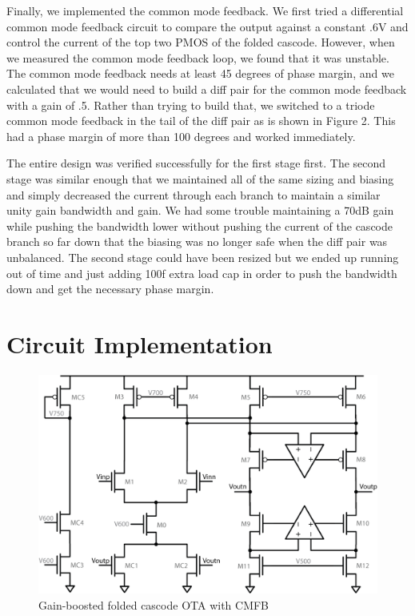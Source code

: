 \documentclass[conference]{IEEEtran}
\begin{document}
Finally, we implemented the common mode feedback. We first tried a differential common mode feedback circuit to compare the output against a constant .6V and control the current of the top two PMOS of the folded cascode. However, when we measured the common mode feedback loop, we found that it was unstable. The common mode feedback needs at least 45 degrees of phase margin, and we calculated that we would need to build a diff pair for the common mode feedback with a gain of .5. Rather than trying to build that, we switched to a triode common mode feedback in the tail of the diff pair as is shown in Figure 2. This had a phase margin of more than 100 degrees and worked immediately. 

The entire design was verified successfully for the first stage first. The second stage was similar enough that we maintained all of the same sizing and biasing and simply decreased the current through each branch to maintain a similar unity gain bandwidth and gain. We had some trouble maintaining a 70dB gain while pushing the bandwidth lower without pushing the current of the cascode branch so far down that the biasing was no longer safe when the diff pair was unbalanced. The second stage could have been resized but we ended up running out of time and just adding 100f extra load cap in order to push the bandwidth down and get the necessary phase margin. \\


\section{Circuit Implementation}

\begin{figure}[h]
\centering
\includegraphics[width=\linewidth]{illus/main_ota}
\caption{Gain-boosted folded cascode OTA with CMFB}
\label{fig:main-ota}
\end{figure}
\end{document}
